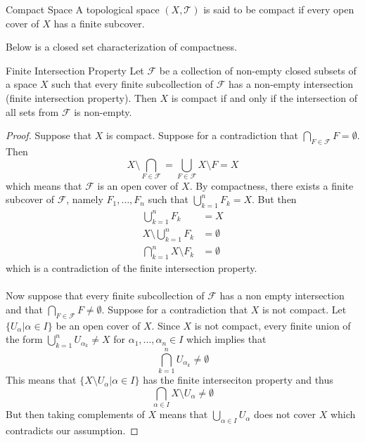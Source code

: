 \documentclass[a4paper]{article}
\begin{document}
\begin{defn}{Compact Space}{} A topological space $(X,\mathcal{T})$ is said to be compact if every open cover of $X$ has a finite subcover. 
\end{defn}

Below is a closed set characterization of compactness. 

\begin{thm}{Finite Intersection Property}{} Let $\mathcal{F}$ be a collection of non-empty closed subsets of a space $X$ such that every finite subcollection of $\mathcal{F}$ has a non-empty intersection (finite intersection property). Then $X$ is compact if and only if the intersection of all sets from $\mathcal{F}$ is non-empty. \tcbline
\begin{proof}
Suppose that $X$ is compact. Suppose for a contradiction that $\bigcap_{F\in\mathcal{F}}F=\emptyset$. Then $$X\setminus\bigcap_{F\in\mathcal{F}}=\bigcup_{F\in\mathcal{F}}X\setminus F=X$$ which means that $\mathcal{F}$ is an open cover of $X$. By compactness, there exists a finite subcover of $\mathcal{F}$, namely $F_1,\dots, F_n$ such that $\bigcup_{k=1}^nF_k=X$. But then 
\begin{align*}
\bigcup_{k=1}^nF_k&=X\\
X\setminus\bigcup_{k=1}^nF_k&=\emptyset\\
\bigcap_{k=1}^nX\setminus F_k&=\emptyset
\end{align*}
which is a contradiction of the finite intersection property. \\~\\
Now suppose that every finite subcollection of $\mathcal{F}$ has a non empty intersection and that $\bigcap_{F\in\mathcal{F}}F\neq\emptyset$. Suppose for a contradiction that $X$ is not compact. Let $\{U_\alpha|\alpha\in I\}$ be an open cover of $X$. Since $X$ is not compact, every finite union of the form $\bigcup_{k=1}^nU_{\alpha_k}\neq X$ for $\alpha_1,\dots,\alpha_n\in I$ which implies that $$\bigcap_{k=1}^nU_{\alpha_k}\neq\emptyset$$ This means that $\{X\setminus U_\alpha|\alpha\in I\}$ has the finite interseciton property and thus $$\bigcap_{\alpha\in I}X\setminus U_\alpha\neq\emptyset$$ But then taking complements of $X$ means that $\bigcup_{\alpha\in I}U_\alpha$ does not cover $X$ which contradicts our assumption. 
\end{proof}
\end{thm}
\end{document}
